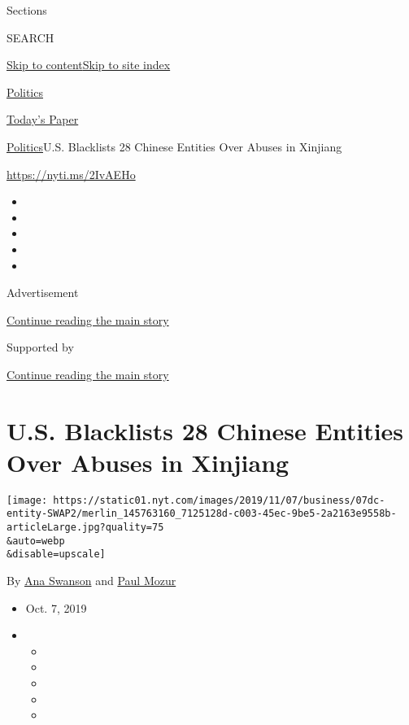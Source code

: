 Sections

SEARCH

\protect\hyperlink{site-content}{Skip to
content}\protect\hyperlink{site-index}{Skip to site index}

\href{https://www.nytimes.com/section/politics}{Politics}

\href{https://myaccount.nytimes.com/auth/login?response_type=cookie\&client_id=vi}{}

\href{https://www.nytimes.com/section/todayspaper}{Today's Paper}

\href{/section/politics}{Politics}\textbar{}U.S. Blacklists 28 Chinese
Entities Over Abuses in Xinjiang

\url{https://nyti.ms/2IvAEHo}

\begin{itemize}
\item
\item
\item
\item
\item
\end{itemize}

Advertisement

\protect\hyperlink{after-top}{Continue reading the main story}

Supported by

\protect\hyperlink{after-sponsor}{Continue reading the main story}

\hypertarget{us-blacklists-28-chinese-entities-over-abuses-in-xinjiang}{%
\section{U.S. Blacklists 28 Chinese Entities Over Abuses in
Xinjiang}\label{us-blacklists-28-chinese-entities-over-abuses-in-xinjiang}}

\texttt{[image: https://static01.nyt.com/images/2019/11/07/business/07dc-entity-SWAP2/merlin\_145763160\_7125128d-c003-45ec-9be5-2a2163e9558b-articleLarge.jpg?quality=75\\\&auto=webp\\\&disable=upscale]}

By \href{https://www.nytimes.com/by/ana-swanson}{Ana Swanson} and
\href{https://www.nytimes.com/by/paul-mozur}{Paul Mozur}

\begin{itemize}
\item
  Oct. 7, 2019
\item
  \begin{itemize}
  \item
  \item
  \item
  \item
  \item
  \end{itemize}
\end{itemize}

